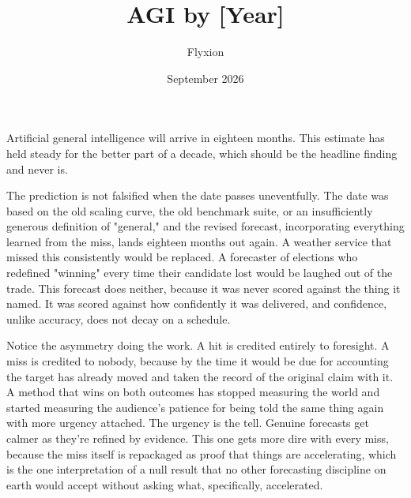 \documentclass[11pt]{article}
\title{AGI by [Year]}
\author{Flyxion}
\date{September 2026}
\begin{document}
\maketitle

Artificial general intelligence will arrive in eighteen months. This estimate has held steady for the better part of a decade, which should be the headline finding and never is.

The prediction is not falsified when the date passes uneventfully. The date was based on the old scaling curve, the old benchmark suite, or an insufficiently generous definition of "general," and the revised forecast, incorporating everything learned from the miss, lands eighteen months out again. A weather service that missed this consistently would be replaced. A forecaster of elections who redefined "winning" every time their candidate lost would be laughed out of the trade. This forecast does neither, because it was never scored against the thing it named. It was scored against how confidently it was delivered, and confidence, unlike accuracy, does not decay on a schedule.

Notice the asymmetry doing the work. A hit is credited entirely to foresight. A miss is credited to nobody, because by the time it would be due for accounting the target has already moved and taken the record of the original claim with it. A method that wins on both outcomes has stopped measuring the world and started measuring the audience's patience for being told the same thing again with more urgency attached. The urgency is the tell. Genuine forecasts get calmer as they're refined by evidence. This one gets more dire with every miss, because the miss itself is repackaged as proof that things are accelerating, which is the one interpretation of a null result that no other forecasting discipline on earth would accept without asking what, specifically, accelerated.
\end{document}
